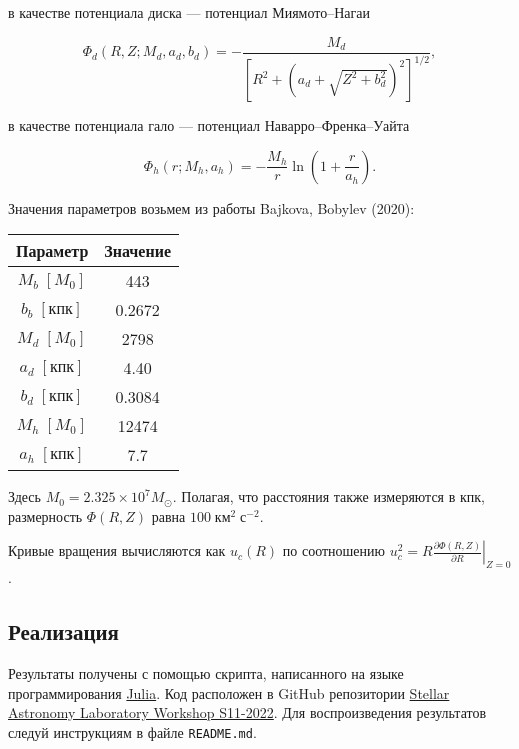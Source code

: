 \documentclass[a4paper, oneside]{article}
\newcommand{\su}{\vspace{-0.5em}}
\newcommand{\npar}{\par\vspace{\baselineskip}}
\begin{document}
в качестве потенциала диска --- потенциал Миямото–Нагаи

\su
\begin{equation}
  \Phi_d(R, Z; M_d, a_d, b_d) = - \frac{M_d}{\left[ R^2 + \left( a_d + \sqrt{Z^2 + b_d^2} \right)^2 \right]^{1/2}},
\end{equation}

в качестве потенциала гало --- потенциал Наварро–Френка–Уайта

\su
\begin{equation}
  \Phi_h(r; M_h, a_h) = - \frac{M_h}{r} \ln{\left( 1 + \frac{r}{a_h} \right)}.
\end{equation}

Значения параметров возьмем из работы Bajkova, Bobylev (2020):

\begin{table}[h]
  \centering
  \begin{tabular}{cc}
    \toprule
    Параметр &
    Значение \\
    \midrule
    $ M_b \; [M_0] $ & 443 \\
    $ b_b \; [\mathrm{кпк}] $ & 0.2672 \\
    $ M_d \; [M_0] $ & 2798 \\
    $ a_d \; [\mathrm{кпк}] $ & 4.40 \\
    $ b_d \; [\mathrm{кпк}] $ & 0.3084 \\
    $ M_h \; [M_0] $ & 12474 \\
    $ a_h \; [\mathrm{кпк}] $ & 7.7 \\
    \bottomrule
  \end{tabular}
\end{table}

Здесь $ M_0 = 2.325 \times 10^7 M_\odot $. Полагая, что расстояния также измеряются в кпк, размерность $ \Phi(R, Z) $ равна $ 100 \; \mathrm{км}^2 \; \mathrm{с}^{-2} $.

\vspace{\baselineskip}

Кривые вращения вычисляются как $ u_c(R) $ по соотношению $ u_c^2 = R \left. \frac{\partial \Phi(R, Z)}{\partial R} \right|_{Z=0} $.

\subsection*{Реализация}

Результаты получены с помощью скрипта, написанного на языке программирования \href{https://julialang.org}{Julia}. Код расположен в GitHub репозитории \href{https://github.com/paveloom-university/Stellar-Astronomy-Laboratory-Workshop-S11-2022}{Stellar Astronomy Laboratory Workshop S11-2022}. Для воспроизведения результатов следуй инструкциям в файле {\footnotesize \texttt{README.md}}. \npar
\end{document}
